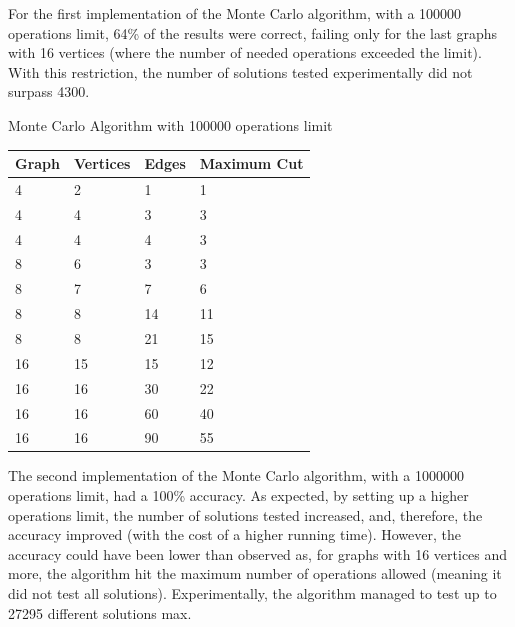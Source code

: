 \documentclass[]{revdetua}
\begin{document}
\pagebreak

For the first implementation of the Monte Carlo algorithm, with a 100000 operations limit, 64\% of the results were correct, failing only for the last graphs with 16 vertices (where the number of needed operations exceeded the limit). With this restriction, the number of solutions tested experimentally did not surpass 4300. 

\begin{table}[!ht]
    \centering
    Monte Carlo Algorithm with 100000 operations limit
    \begin{tabular}{|l|l|l|l|}
    \hline
        Graph & Vertices & Edges & Maximum Cut \\ \hline
        4 & 2 & 1 & 1 \\ \hline
        4 & 4 & 3 & 3 \\ \hline
        4 & 4 & 4 & 3 \\ \hline
        8 & 6 & 3 & 3 \\ \hline
        8 & 7 & 7 & 6 \\ \hline
        8 & 8 & 14 & 11 \\ \hline
        8 & 8 & 21 & 15 \\ \hline
        16 & 15 & 15 & 12 \\ \hline
        16 & 16 & 30 & 22 \\ \hline
        16 & 16 & 60 & 40 \\ \hline
        16 & 16 & 90 & 55 \\ \hline
    \end{tabular}
\end{table}

The second implementation of the Monte Carlo algorithm, with a 1000000 operations limit, had a 100\% accuracy. As expected, by setting up a higher operations limit, the number of solutions tested increased, and, therefore, the accuracy improved (with the cost of a higher running time). However, the accuracy could have been lower than observed as, for graphs with 16 vertices and more, the algorithm hit the maximum number of operations allowed (meaning it did not test all solutions). Experimentally, the algorithm managed to test up to 27295 different solutions max.
\end{document}
